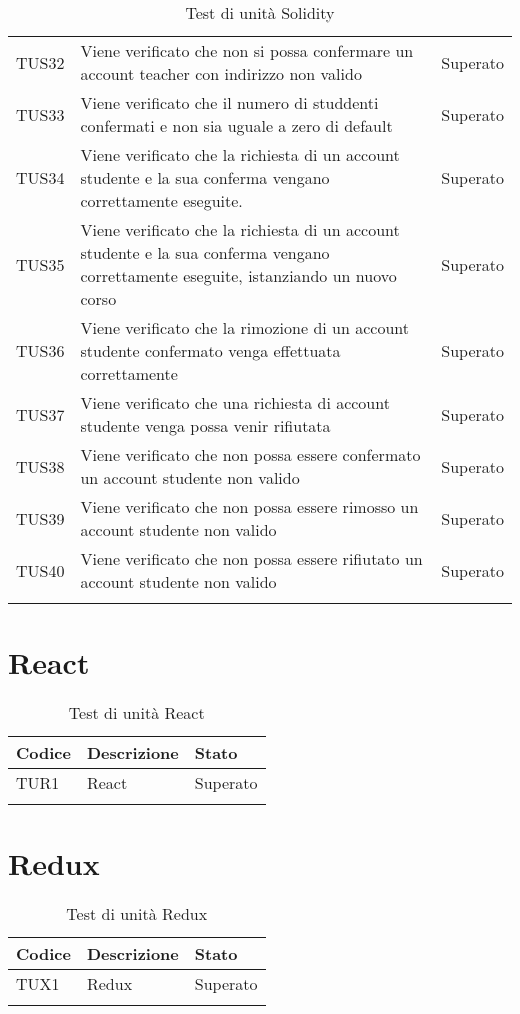 \documentclass[PianoDiQualifica.tex]{subfiles}
\begin{document}
\begin{longtable}[H]{P{2cm}P{8.5cm}P{3cm}}
	TUS32 & Viene verificato che non si possa confermare un account teacher con indirizzo non valido & Superato \\
	TUS33 & Viene verificato che il numero di studdenti confermati e non sia uguale a zero di default & Superato \\
	TUS34 & Viene verificato che la richiesta di un account studente e la sua conferma vengano correttamente eseguite. & Superato \\
	TUS35 & Viene verificato che la richiesta di un account studente e la sua conferma vengano correttamente eseguite, istanziando un nuovo corso & Superato \\
	TUS36 & Viene verificato che la rimozione di un account studente confermato venga effettuata correttamente & Superato \\
	TUS37 & Viene verificato che una richiesta di account studente venga possa venir rifiutata & Superato \\
	TUS38 & Viene verificato che non possa essere confermato un account studente non valido & Superato \\
	TUS39 & Viene verificato che non possa essere rimosso un account studente non valido & Superato \\
	TUS40 & Viene verificato che non possa essere rifiutato un account studente non valido & Superato \\
	
	\hiderowcolors
	\caption{Test di unità Solidity}
\end{longtable}

\section{React}
\begin{longtable}[H]{P{2cm}P{8.5cm}P{3cm}}
	\color{CHeaderText}\textbf{Codice} & 
	\color{CHeaderText}\textbf{Descrizione} & 
	\color{CHeaderText}\textbf{Stato}\\
	\endhead
	TUR1 & React & Superato \\ 
	\hiderowcolors
	\caption{Test di unità React}
\end{longtable}

\section{Redux}
\begin{longtable}[H]{P{2cm}P{8.5cm}P{3cm}}
	\color{CHeaderText}\textbf{Codice} & 
	\color{CHeaderText}\textbf{Descrizione} & 
	\color{CHeaderText}\textbf{Stato}\\
	\endhead
	TUX1 & Redux & Superato \\ 
	\hiderowcolors
	\caption{Test di unità Redux}
\end{longtable}
\end{document}
